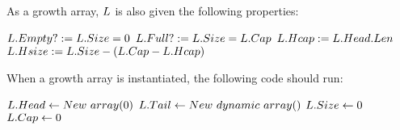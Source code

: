 As a growth array, $L$ is also given the following properties:

\begin{algorithm}
	\begin{algorithmic}
		\State $L.Empty? := L.Size = 0$
		\State
		\State $L.Full? := L.Size = L.Cap$
		\State
		\State $L.Hcap := L.Head.Len$
		\State
		\State $L.Hsize := L.Size - \left(L.Cap - L.Hcap\right)$
	\end{algorithmic}
\end{algorithm}

When a growth array is instantiated, the following code should run:

\begin{algorithm}
	\begin{algorithmic}
		\State $L.Head \gets New\ array(0)$
		\State $L.Tail \gets New\ dynamic\ array()$
		\State $L.Size \gets 0$
		\State $L.Cap \gets 0$
	\end{algorithmic}
\end{algorithm}